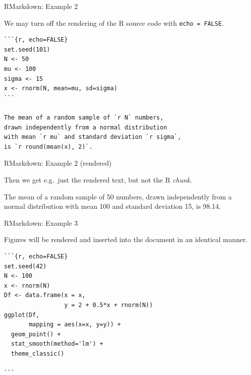 \documentclass[10pt,ignorenonframetext,]{beamer}
\begin{document}
\begin{frame}[fragile]{RMarkdown: Example 2}
\protect\hypertarget{rmarkdown-example-2}{}

We may turn off the rendering of the R source code with
\texttt{echo\ =\ FALSE}.

\begin{verbatim}
```{r, echo=FALSE}
set.seed(101)
N <- 50
mu <- 100
sigma <- 15
x <- rnorm(N, mean=mu, sd=sigma)
```

The mean of a random sample of `r N` numbers,
drawn independently from a normal distribution 
with mean `r mu` and standard deviation `r sigma`, 
is `r round(mean(x), 2)`.
\end{verbatim}

\end{frame}

\begin{frame}{RMarkdown: Example 2 (rendered)}
\protect\hypertarget{rmarkdown-example-2-rendered}{}

Then we get e.g.~just the rendered text, but not the R \emph{chunk}.

The mean of a random sample of 50 numbers, drawn independently from a
normal distribution with mean 100 and standard deviation 15, is 98.14.

\end{frame}

\begin{frame}[fragile]{RMarkdown: Example 3}
\protect\hypertarget{rmarkdown-example-3}{}

Figures will be rendered and inserted into the document in an identical
manner.

\begin{verbatim}
```{r, echo=FALSE}
set.seed(42)
N <- 100
x <- rnorm(N)
Df <- data.frame(x = x, 
                 y = 2 + 0.5*x + rnorm(N))
ggplot(Df,
       mapping = aes(x=x, y=y)) +
  geom_point() +
  stat_smooth(method='lm') +
  theme_classic()

```
\end{verbatim}

\end{frame}
\end{document}
